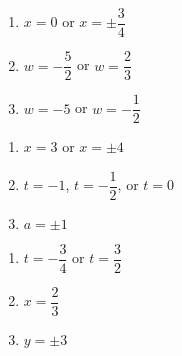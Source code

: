 \documentclass[11pt]{article}
\theoremstyle{definition}  %
\newcounter{HW}
\begin{document}
\begin{multicols}{3}
\begin{enumerate}
\setcounter{enumi}{\value{HW}}

\item $x = 0$ or $x = \pm \dfrac{3}{4}$ 
\item $w = -\dfrac{5}{2}$ or $w = \dfrac{2}{3}$
\item $w=-5$ or $w = -\dfrac{1}{2}$

\setcounter{HW}{\value{enumi}}
\end{enumerate}
\end{multicols}


\begin{multicols}{3}
\begin{enumerate}
\setcounter{enumi}{\value{HW}}

\item $x=3$ or $x = \pm 4$ 
\item $t = -1$, $t= -\dfrac{1}{2}$, or $t = 0$
\item $a = \pm 1$

\setcounter{HW}{\value{enumi}}
\end{enumerate}
\end{multicols}

\begin{multicols}{3}
\begin{enumerate}
\setcounter{enumi}{\value{HW}}

\item $t = -\dfrac{3}{4}$ or $t = \dfrac{3}{2}$
\item $x = \dfrac{2}{3}$
\item $y = \pm 3$  
\setcounter{HW}{\value{enumi}}
\end{enumerate}
\end{multicols}
\end{document}
